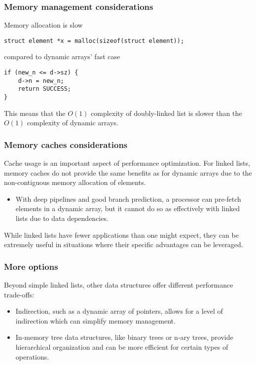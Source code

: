 \documentclass[12pt]{article}
\begin{document}
\subsubsection{Memory management considerations}

Memory allocation is slow

\begin{verbatim}
struct element *x = malloc(sizeof(struct element));
\end{verbatim}

compared to dynamic arrays' fast case

\begin{verbatim}
if (new_n <= d->sz) {
    d->n = new_n;
    return SUCCESS;
}
\end{verbatim}

This means that the $O(1)$ complexity of doubly-linked list is slower than the $O(1)$ complexity of dynamic arrays.
\subsubsection{Memory caches considerations}
Cache usage is an important aspect of performance optimization. For linked lists, memory caches do not provide the same benefits as for dynamic arrays due to the non-contiguous memory allocation of elements.

\begin{itemize}
    \item With deep pipelines and good branch prediction, a processor can pre-fetch elements in a dynamic array, but it cannot do so as effectively with linked lists due to data dependencies.
\end{itemize}
While linked lists have fewer applications than one might expect, they can be extremely useful in situations where their specific advantages can be leveraged.


\subsubsection{More options}
Beyond simple linked lists, other data structures offer different performance trade-offs:

\begin{itemize}
    \item Indirection, such as a dynamic array of pointers, allows for a level of indirection which can simplify memory management.
    \item In-memory tree data structures, like binary trees or n-ary trees, provide hierarchical organization and can be more efficient for certain types of operations.
\end{itemize}
\end{document}

